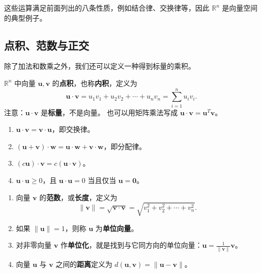 这些运算满足前面列出的八条性质，例如结合律、交换律等，因此 $\mathbb{R}^n$ 是向量空间的典型例子。

\subsection{点积、范数与正交}

除了加法和数乘之外，我们还可以定义一种得到标量的乘积。

\begin{definition}[点积]
$\mathbb{R}^n$ 中向量 $\mathbf{u},\mathbf{v}$ 的\textbf{点积}，也称\textbf{内积}，定义为
\[ \mathbf{u}\cdot\mathbf{v}=u_1v_1+u_2v_2+\cdots+u_nv_n=\sum_{i=1}^{n}u_iv_i. \]
注意：$\mathbf{u}\cdot\mathbf{v}$ 是\textbf{标量}，不是向量。
也可以用矩阵乘法写成 $\mathbf{u}\cdot\mathbf{v}=\mathbf{u}^T\mathbf{v}$。
\end{definition}

\begin{property}[点积的性质]
\begin{enumerate}
    \item $\mathbf{u}\cdot\mathbf{v}=\mathbf{v}\cdot\mathbf{u}$，即交换律。
    \item $(\mathbf{u}+\mathbf{v})\cdot\mathbf{w}=\mathbf{u}\cdot\mathbf{w}+\mathbf{v}\cdot\mathbf{w}$，即分配律。
    \item $(c\mathbf{u})\cdot\mathbf{v}=c(\mathbf{u}\cdot\mathbf{v})$。
    \item $\mathbf{u}\cdot\mathbf{u}\geq0$，且 $\mathbf{u}\cdot\mathbf{u}=0$ 当且仅当 $\mathbf{u}=\mathbf{0}$。
\end{enumerate}
\end{property}

\begin{definition}[范数与距离]
\begin{enumerate}
    \item 向量 $\mathbf{v}$ 的\textbf{范数}，或\textbf{长度}，定义为
    \[ \|\mathbf{v}\|=\sqrt{\mathbf{v}\cdot\mathbf{v}}=\sqrt{v_1^2+v_2^2+\cdots+v_n^2}. \]
    \item 如果 $\|\mathbf{u}\|=1$，则称 $\mathbf{u}$ 为\textbf{单位向量}。
    \item 对非零向量 $\mathbf{v}$ 作\textbf{单位化}，就是找到与它同方向的单位向量：$\mathbf{u}=\frac{1}{\|\mathbf{v}\|}\mathbf{v}$。
    \item 向量 $\mathbf{u}$ 与 $\mathbf{v}$ 之间的\textbf{距离}定义为 $d(\mathbf{u},\mathbf{v})=\|\mathbf{u}-\mathbf{v}\|$。
\end{enumerate}
\end{definition}

